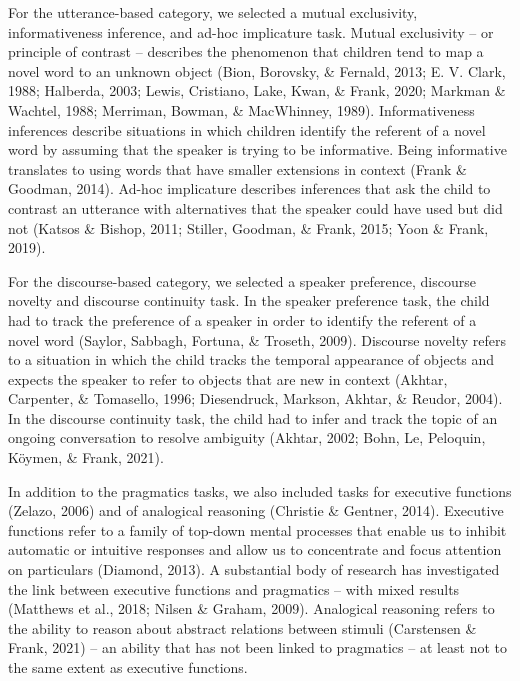 \documentclass[
  man,floatsintext]{apa6}
\begin{document}
For the utterance-based category, we selected a mutual exclusivity, informativeness inference, and ad-hoc implicature task. Mutual exclusivity -- or principle of contrast -- describes the phenomenon that children tend to map a novel word to an unknown object (Bion, Borovsky, \& Fernald, 2013; E. V. Clark, 1988; Halberda, 2003; Lewis, Cristiano, Lake, Kwan, \& Frank, 2020; Markman \& Wachtel, 1988; Merriman, Bowman, \& MacWhinney, 1989). Informativeness inferences describe situations in which children identify the referent of a novel word by assuming that the speaker is trying to be informative. Being informative translates to using words that have smaller extensions in context (Frank \& Goodman, 2014). Ad-hoc implicature describes inferences that ask the child to contrast an utterance with alternatives that the speaker could have used but did not (Katsos \& Bishop, 2011; Stiller, Goodman, \& Frank, 2015; Yoon \& Frank, 2019).

For the discourse-based category, we selected a speaker preference, discourse novelty and discourse continuity task. In the speaker preference task, the child had to track the preference of a speaker in order to identify the referent of a novel word (Saylor, Sabbagh, Fortuna, \& Troseth, 2009). Discourse novelty refers to a situation in which the child tracks the temporal appearance of objects and expects the speaker to refer to objects that are new in context (Akhtar, Carpenter, \& Tomasello, 1996; Diesendruck, Markson, Akhtar, \& Reudor, 2004). In the discourse continuity task, the child had to infer and track the topic of an ongoing conversation to resolve ambiguity (Akhtar, 2002; Bohn, Le, Peloquin, Köymen, \& Frank, 2021).

In addition to the pragmatics tasks, we also included tasks for executive functions (Zelazo, 2006) and of analogical reasoning (Christie \& Gentner, 2014). Executive functions refer to a family of top-down mental processes that enable us to inhibit automatic or intuitive responses and allow us to concentrate and focus attention on particulars (Diamond, 2013). A substantial body of research has investigated the link between executive functions and pragmatics -- with mixed results (Matthews et al., 2018; Nilsen \& Graham, 2009). Analogical reasoning refers to the ability to reason about abstract relations between stimuli (Carstensen \& Frank, 2021) -- an ability that has not been linked to pragmatics -- at least not to the same extent as executive functions.
\end{document}
